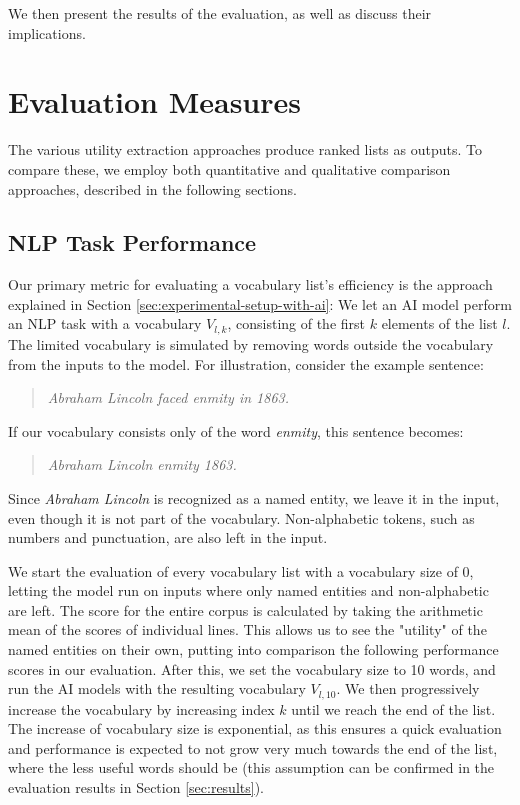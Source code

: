 We then present the results of the evaluation, as well as discuss their implications.

\section{Evaluation Measures}

The various utility extraction approaches produce ranked lists as outputs.
To compare these, we employ both quantitative and qualitative comparison approaches, described in the following sections.



\subsection{NLP Task Performance}
Our primary metric for evaluating a vocabulary list's efficiency is the approach explained in Section \ref{sec:experimental-setup-with-ai}:
We let an AI model perform an NLP task with a vocabulary $V_{l, k}$, consisting of the first $k$ elements of the list $l$.
The limited vocabulary is simulated by removing words outside the vocabulary from the inputs to the model.
For illustration, consider the example sentence:

\begin{quote}
	\textit{Abraham Lincoln faced enmity in 1863.}
\end{quote}

If our vocabulary consists only of the word \textit{enmity}, this sentence becomes:

\begin{quote}
	\textit{Abraham Lincoln enmity 1863.}
\end{quote}

Since \textit{Abraham Lincoln} is recognized as a named entity, we leave it in the input, even though it is not part of the vocabulary.
Non-alphabetic tokens, such as numbers and punctuation, are also left in the input.


We start the evaluation of every vocabulary list with a vocabulary size of 0, letting the model run on inputs where only named entities and non-alphabetic are left.
The score for the entire corpus is calculated by taking the arithmetic mean of the scores of individual lines.
This allows us to see the "utility" of the named entities on their own, putting into comparison the following performance scores in our evaluation.
After this, we set the vocabulary size to 10 words, and run the AI models with the resulting vocabulary $V_{l, 10}$.
We then progressively increase the vocabulary by increasing index $k$ until we reach the end of the list.
The increase of vocabulary size is exponential, as this ensures a quick evaluation and performance is expected to not grow very much towards the end of the list, where the less useful words should be (this assumption can be confirmed in the evaluation results in Section \ref{sec:results}).

